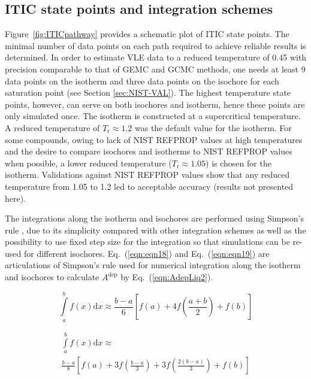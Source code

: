 \documentclass[5p,times]{elsarticle}
\begin{document}
\subsection{ITIC state points and integration schemes}\label{sec:ITIC-state-points}
Figure~\ref{fig:ITICpathway} provides a schematic plot of ITIC state points. The minimal number of data points on each path required to achieve reliable results is determined. 
In order to estimate VLE data to a reduced temperature of 0.45 with precision comparable to that of GEMC and GCMC methods, one needs at least 9 data points on the isotherm and three data points on the isochore for each saturation point (see Section \ref{sec:NIST-VAL}).
The highest temperature state points, however, can serve on both isochores and isotherm, hence these points are only simulated once. The isotherm is constructed at a supercritical temperature. A reduced temperature of $T_\mathrm{r} \approx 1.2$ was the default value for the isotherm. For some compounds, owing to lack of NIST REFPROP values at high temperatures and the desire to compare isochores and isotherms to NIST REFPROP values when possible, a lower reduced temperature ($T_\mathrm{r} \approx 1.05$) is chosen for the isotherm. Validations against NIST REFPROP values show that any reduced temperature from 1.05 to 1.2 led to acceptable accuracy (results not presented here).


The integrations along the isotherm and isochores are performed using Simpson's rule \cite{atkinson2008}, due to its simplicity compared with other integration schemes as well as the possibility to use fixed step size for the integration so that simulations can be re-used for different isochores. Eq.~(\ref{eqn:eqn18}) and Eq.~(\ref{eqn:eqn19}) are
articulations of Simpson's rule used for numerical integration along the isotherm and isochores to calculate $A^{\mathrm{dep}}$ by Eq.~(\ref{eqn:AdepLiq2}).

\begin{equation}
\int\limits_a^b {f(x)\mathrm{d} x \approx \frac{{b - a}}{6}} \left[ {f(a) + 4f \left( \frac{{a + b}}{2} \right) + f(b)} \right] \label{eqn:eqn18}
\end{equation}

\begin{equation}
\begin{array}{l}
{\int\limits_a^b f(x)\mathrm{d}x \approx }
\\ 
{{\frac{{b - a}}{8} \left[ {f(a) + 3f \left( \frac{{b - a}}{3} \right) + 3f \left( \frac{{2(b - a)}}{3} \right) + f(b)} \right]}}  
\end{array}
\label{eqn:eqn19}
\end{equation}
\end{document}
